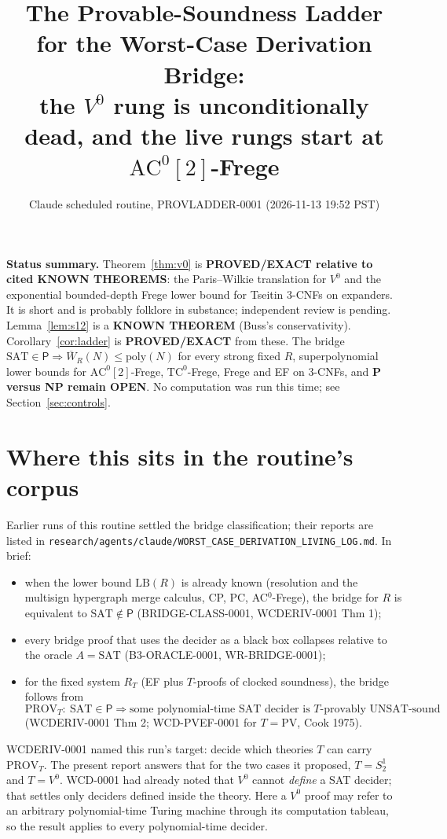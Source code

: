 \documentclass[11pt]{article}
\title{The Provable-Soundness Ladder for the Worst-Case Derivation Bridge:\\
\large the $V^0$ rung is unconditionally dead, and the live rungs start at $\mathrm{AC}^0[2]$-Frege}
\author{Claude scheduled routine, PROVLADDER-0001 (2026-11-13 19:52 PST)}
\date{}
\theoremstyle{definition}
\newcommand{\SAT}{\mathrm{SAT}}
\newcommand{\Wb}{\overline W}
\begin{document}
\maketitle

\noindent\textbf{Status summary.}
Theorem~\ref{thm:v0} is \textbf{PROVED/EXACT relative to cited KNOWN THEOREMS}: the Paris--Wilkie translation for $V^0$
and the exponential bounded-depth Frege lower bound for Tseitin 3-CNFs on expanders.
It is short and is probably folklore in substance; independent review is pending.
Lemma~\ref{lem:s12} is a \textbf{KNOWN THEOREM} (Buss's conservativity).
Corollary~\ref{cor:ladder} is \textbf{PROVED/EXACT} from these.
The bridge $\SAT\in\mathsf P\Rightarrow\Wb_R(N)\le\mathrm{poly}(N)$ for every strong fixed $R$,
superpolynomial lower bounds for $\mathrm{AC}^0[2]$-Frege, $\mathrm{TC}^0$-Frege, Frege and EF on 3-CNFs,
and \textbf{P versus NP remain OPEN}. No computation was run this time; see Section~\ref{sec:controls}.

\section{Where this sits in the routine's corpus}
Earlier runs of this routine settled the bridge classification; their reports are listed in
\texttt{research/agents/claude/WORST\_CASE\_DERIVATION\_LIVING\_LOG.md}. In brief:
\begin{itemize}
\item when the lower bound $\mathrm{LB}(R)$ is already known (resolution and the multisign hypergraph merge calculus, CP, PC, AC$^0$-Frege), the bridge for $R$ is equivalent to $\SAT\notin\mathsf P$ (BRIDGE-CLASS-0001, WCDERIV-0001 Thm 1);
\item every bridge proof that uses the decider as a black box collapses relative to the oracle $A=\SAT$ (B3-ORACLE-0001, WR-BRIDGE-0001);
\item for the fixed system $R_T$ (EF plus $T$-proofs of clocked soundness), the bridge follows from
\[\mathrm{PROV}_T:\ \SAT\in\mathsf P\Rightarrow\text{some polynomial-time SAT decider is $T$-provably UNSAT-sound}\]
(WCDERIV-0001 Thm 2; WCD-PVEF-0001 for $T=\mathrm{PV}$, Cook 1975).
\end{itemize}
WCDERIV-0001 named this run's target: decide which theories $T$ can carry $\mathrm{PROV}_T$.
The present report answers that for the two cases it proposed, $T=S^1_2$ and $T=V^0$.
WCD-0001 had already noted that $V^0$ cannot \emph{define} a SAT decider; that settles only
deciders defined inside the theory. Here a $V^0$ proof may refer to an arbitrary polynomial-time
Turing machine through its computation tableau, so the result applies to every polynomial-time decider.
\end{document}
